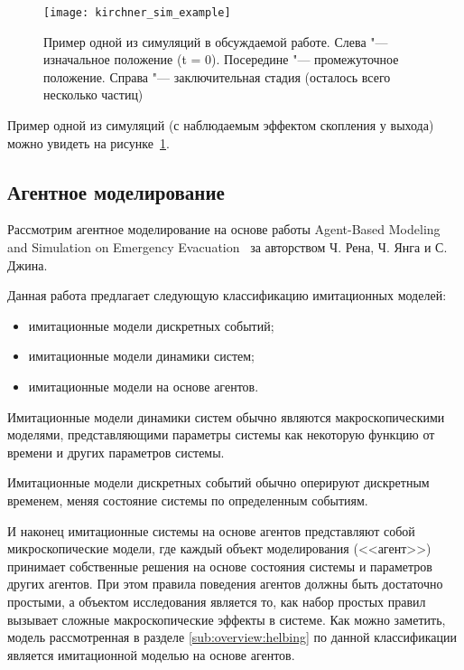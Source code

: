 \begin{figure}[ht!]
  \texttt{[image: kirchner\_sim\_example]}
  \caption{Пример одной из симуляций в обсуждаемой работе. Слева "--- изначальное положение (t = 0). Посередине "--- промежуточное положение. Справа "--- заключительная стадия (осталось всего несколько частиц)}
  \label{sub:overview:kirchner:sim_example}
\end{figure}

Пример одной из симуляций (с наблюдаемым эффектом скопления у выхода) можно увидеть на рисунке~\ref{sub:overview:kirchner:sim_example}.

\subsection{Агентное моделирование}
\label{sub:overview:agent}

Рассмотрим агентное моделирование на основе работы Agent-Based Modeling and Simulation on Emergency Evacuation~\cite{ren2009agent} за авторством Ч. Рена, Ч. Янга и С. Джина.

Данная работа предлагает следующую классификацию имитационных моделей:

\begin{itemize}
  \item имитационные модели дискретных событий;
  \item имитационные модели динамики систем;
  \item имитационные модели на основе агентов.
\end{itemize}

Имитационные модели динамики систем обычно являются макроскопическими моделями, представляющими параметры системы как некоторую функцию от времени и других параметров системы.

Имитационные модели дискретных событий обычно оперируют дискретным временем, меняя состояние системы по определенным событиям.

И наконец имитационные системы на основе агентов представляют собой микроскопические модели,
где каждый объект моделирования (<<агент>>) принимает собственные решения на основе состояния системы и параметров других агентов.
При этом правила поведения агентов должны быть достаточно простыми, а объектом исследования является то, как набор простых правил
вызывает сложные макроскопические эффекты в системе.
Как можно заметить, модель рассмотренная в разделе \ref{sub:overview:helbing} по данной классификации является имитационной моделью на основе агентов.


